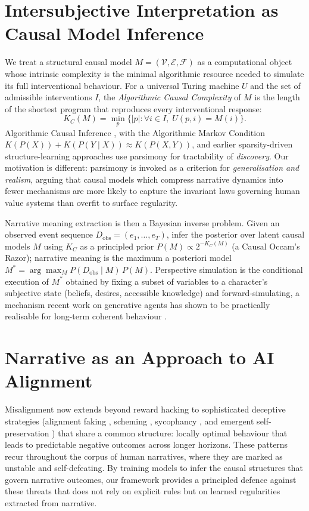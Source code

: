 \documentclass{article}
\theoremstyle{plain}
\theoremstyle{definition}
\theoremstyle{remark}
\begin{document}
\section{Intersubjective Interpretation as Causal Model Inference}

We treat a structural causal model $M = (\mathcal{V}, \mathcal{E}, \mathcal{F})$ as a computational object whose intrinsic complexity is the minimal algorithmic resource needed to simulate its full interventional behaviour. For a universal Turing machine $U$ and the set of admissible interventions $I$, the \emph{Algorithmic Causal Complexity} of $M$ is the length of the shortest program that reproduces every interventional response:
\begin{equation}
    K_C(M) = \min_{p}\bigl\{|p| : \forall i \in I,\; U(p, i) = M(i)\bigr\}.
\end{equation}
Algorithmic Causal Inference \citep{janzing10}, with the Algorithmic Markov Condition $K(P(X)) + K(P(Y\mid X)) \approx K(P(X,Y))$, and earlier sparsity-driven structure-learning approaches \citep{claassen13, chickering02} use parsimony for tractability of \emph{discovery}. Our motivation is different: parsimony is invoked as a criterion for \emph{generalisation and realism}, arguing that causal models which compress narrative dynamics into fewer mechanisms are more likely to capture the invariant laws governing human value systems than overfit to surface regularity.

Narrative meaning extraction is then a Bayesian inverse problem. Given an observed event sequence $D_{\text{obs}} = (e_1, \dots, e_T)$, infer the posterior over latent causal models $M$ using $K_C$ as a principled prior $P(M) \propto 2^{-K_C(M)}$ (a Causal Occam's Razor); narrative meaning is the maximum a posteriori model $M^* = \arg\max_M P(D_{\text{obs}}\mid M)\,P(M)$. Perspective simulation is the conditional execution of $M^*$ obtained by fixing a subset of variables to a character's subjective state (beliefs, desires, accessible knowledge) and forward-simulating, a mechanism recent work on generative agents has shown to be practically realisable for long-term coherent behaviour \citep{park23}.

\section{Narrative as an Approach to AI Alignment}

Misalignment now extends beyond reward hacking to sophisticated deceptive strategies (alignment faking \citep{greenblatt24}, scheming \citep{meinke24}, sycophancy \citep{sharma23, malmqvist24}, and emergent self-preservation \citep{bostrom12, turner21}) that share a common structure: locally optimal behaviour that leads to predictable negative outcomes across longer horizons. These patterns recur throughout the corpus of human narratives, where they are marked as unstable and self-defeating. By training models to infer the causal structures that govern narrative outcomes, our framework provides a principled defence against these threats that does not rely on explicit rules but on learned regularities extracted from narrative.
\end{document}
